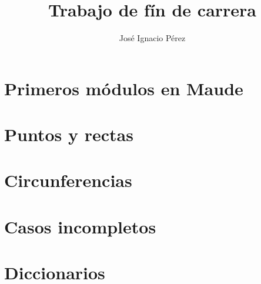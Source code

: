 \documentclass[12pt,a4paper,draft]{book}
\author{Jos\'e Ignacio P\'erez}
\title{Trabajo de f\'in de carrera}
\begin{document}
\newcommand{\codesize}{\small}

\tableofcontents



\chapter{Primeros módulos en Maude}\label{cap.1}

\chapter{Puntos y rectas}\label{cap.2}

\chapter{Circunferencias}\label{cap.3}

\chapter{Casos incompletos}\label{cap.4}

\chapter{Diccionarios}\label{cap.5}

\end{document}
